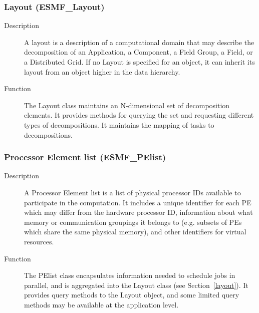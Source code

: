 \subsubsection{Layout (ESMF\_Layout)}
\label{sec:layout} 
\begin{description}
\item [Description] A layout is a description of a computational domain that
may describe the decomposition of an Application, a Component, a Field Group, a Field, or 
a Distributed Grid.
If no Layout is specified for an object, it can inherit its layout from an object
higher in the data hierarchy.  
\item [Function] The Layout class maintains an N-dimensional set of decomposition
elements.  It provides methods for querying the set and requesting different
types of decompositions.  It maintains the mapping of tasks to decompositions.
\end{description}

\subsubsection{Processor Element list (ESMF\_PElist)}
\label{sec:pelist} 
\begin{description}
\item [Description] A Processor Element list is a list of physical processor IDs
available to participate in the computation.  
It includes a unique identifier for each PE which may differ from the
hardware processor ID, 
information about what memory or communication groupings it belongs to (e.g. subsets 
of PEs which share the same physical memory), 
and other identifiers for virtual resources.  
\item [Function] The PElist class encapsulates information needed to schedule
jobs in parallel, and is aggregated into the Layout class (see Section~\ref{layout}).
It provides query methods to the Layout object, and some limited query methods
may be available at the application level.
\end{description}

